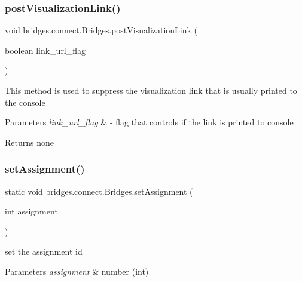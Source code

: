 \subsubsection{\texorpdfstring{post\+Visualization\+Link()}{postVisualizationLink()}}
{\footnotesize\ttfamily void bridges.\+connect.\+Bridges.\+post\+Visualization\+Link (\begin{DoxyParamCaption}\item[{boolean}]{link\+\_\+url\+\_\+flag }\end{DoxyParamCaption})}

This method is used to suppress the visualization link that is usually printed to the console


\begin{DoxyParams}{Parameters}
{\em link\+\_\+url\+\_\+flag} & -\/ flag that controls if the link is printed to console \\
\hline
\end{DoxyParams}
\begin{DoxyReturn}{Returns}
none 
\end{DoxyReturn}
\mbox{\label{classbridges_1_1connect_1_1_bridges_ad56c9d138965c41947bb51fe056c1cc9}} 
\subsubsection{\texorpdfstring{set\+Assignment()}{setAssignment()}}
{\footnotesize\ttfamily static void bridges.\+connect.\+Bridges.\+set\+Assignment (\begin{DoxyParamCaption}\item[{int}]{assignment }\end{DoxyParamCaption})\hspace{0.3cm}{\ttfamily [static]}}

set the assignment id


\begin{DoxyParams}{Parameters}
{\em assignment} & number (int) \\
\hline
\end{DoxyParams}
\mbox{\label{classbridges_1_1connect_1_1_bridges_ade4a9c43e2b608e6b3dc774b73f95749}} 
